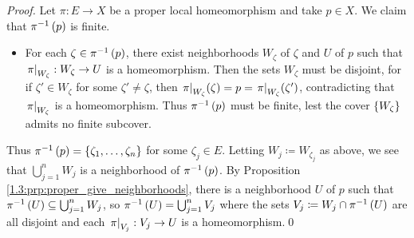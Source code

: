 \documentclass[../Moduli_Spaces_of_Riemann_Surfaces.tex]{subfiles}
\begin{document}
    \begin{proof}
        Let $\pi:E\to X$ be a proper local homeomorphism and take $p\in X$. We claim that $\pi^{-1}\left(p\right)$ is finite.
        \begin{itemize}
            \item For each $\zeta\in\pi^{-1}\left(p\right)$, there exist neighborhoods $W_\zeta$ of $\zeta$ and $U$ of $p$ such that $\left.\pi\right|_{W_\zeta}:W_\zeta\to U$ is a homeomorphism. Then the sets $W_\zeta$ must be disjoint, for if $\zeta'\in W_\zeta$ for some $\zeta'\neq\zeta$, then $\left.\pi\right|_{W_\zeta}\!\left(\zeta\right)=p=\left.\pi\right|_{W_\zeta}\!\left(\zeta'\right)$, contradicting that $\left.\pi\right|_{W_\zeta}$ is a homeomorphism. Thus $\pi^{-1}\left(p\right)$ must be finite, lest the cover $\left\{W_\zeta\right\}$ admits no finite subcover.
        \end{itemize}
        Thus $\pi^{-1}\left(p\right)=\left\{\zeta_1,\dots,\zeta_n\right\}$ for some $\zeta_j\in E$. Letting $W_j\coloneqq W_{\zeta_j}$ as above, we see that $\bigcup_{j=1}^{n}W_j$ is a neighborhood of $\pi^{-1}\left(p\right)$. By Proposition \ref{1.3:prp:proper_give_neighborhoods}, there is a neighborhood $U$ of $p$ such that $\pi^{-1}\left(U\right)\subseteq\bigcup_{j=1}^{n}W_j$, so $\pi^{-1}\left(U\right)=\bigcup_{j=1}^{n}V_j$ where the sets $V_j\coloneqq W_j\cap\pi^{-1}\left(U\right)$ are all disjoint and each $\left.\pi\right|_{V_j}:V_j\to U$ is a homeomorphism.\qed
    \end{proof}
\end{document}
